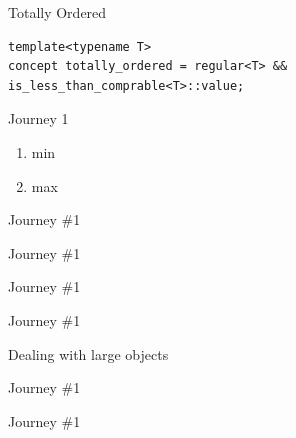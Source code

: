 \documentclass[10pt]{beamer}
\begin{document}
\begin{frame}[fragile]{Totally Ordered}
\begin{lstlisting}[style=cpp]
template<typename T>
concept totally_ordered = regular<T> && is_less_than_comprable<T>::value;

\end{lstlisting}
\end{frame}


\begin{frame}{Journey 1}
    \begin{enumerate}
        \item min
        \item max
    \end{enumerate}
\end{frame}

\begin{frame}{Journey \#1}
    \begin{block}{}
		
	\end{block}
\end{frame}

\begin{frame}{Journey \#1}
    \begin{block}{}
		
	\end{block}
\end{frame}


\begin{frame}{Journey \#1}
    \begin{block}{}
		
	\end{block}
\end{frame}

\begin{frame}{Journey \#1}
    \begin{block}{Dealing with large objects}
		
	\end{block}
\end{frame}

\begin{frame}{Journey \#1}
    \begin{block}{}
		
	\end{block}
\end{frame}

\begin{frame}{Journey \#1}
    \begin{block}{}
		
	\end{block}
\end{frame}
\end{document}
